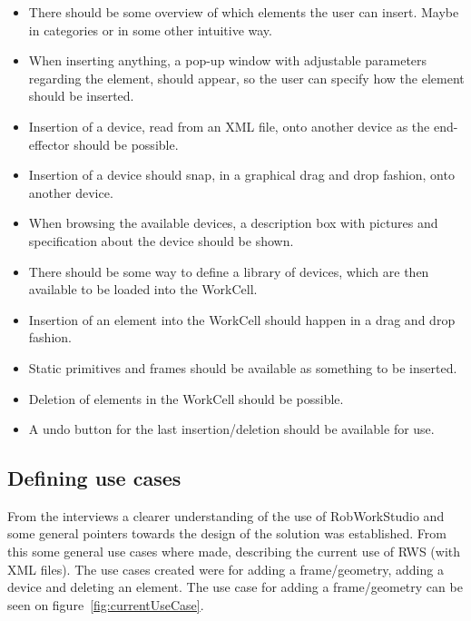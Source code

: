 \begin{itemize}
\item There should be some overview of which elements the user can insert. Maybe in categories or in some other intuitive way.
\item When inserting anything, a pop-up window with adjustable parameters regarding the element, should appear, so the user can specify how the element should be inserted.
\item Insertion of a device, read from an XML file, onto another device as the end-effector should be possible.
\item Insertion of a device should snap, in a graphical drag and drop fashion, onto another device.
\item When browsing the available devices, a description box with pictures and specification about the device should be shown.
\item There should be some way to define a library of devices, which are then available to be loaded into the WorkCell.
\item Insertion of an element into the WorkCell should happen in a drag and drop fashion.
\item Static primitives and frames should be available as something to be inserted.
\item Deletion of elements in the WorkCell should be possible.
\item A undo button for the last insertion/deletion should be available for use.
\end{itemize}

\subsection{Defining use cases}
From the interviews a clearer understanding of the use of RobWorkStudio and some general pointers towards the design of the solution was established. From this some general use cases where made, describing the current use of RWS (with XML files). The use cases created were for adding a frame/geometry, adding a device and deleting an element. The use case for adding a frame/geometry can be seen on figure~\ref{fig:currentUseCase}.

